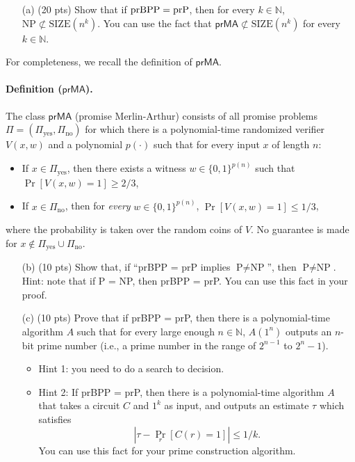 \documentclass[12pt]{article}
\newcommand{\SIZE}{\text{SIZE}}
\newcommand{\NP}{\text{NP}}
\begin{document}
\begin{enumerate}
    \item[(a)] (20 pts) Show that if $\text{prBPP} = \text{prP}$, then for every $k \in \mathbb{N}$, $\NP \not\subset \SIZE(n^k)$. You can use the fact that $\mathsf{prMA} \not\subset \SIZE(n^k)$ for every $k \in \mathbb{N}$.
\end{enumerate}

For completeness, we recall the definition of $\mathsf{prMA}$.

\paragraph{Definition ($\mathsf{prMA}$).}
The class $\mathsf{prMA}$ (promise Merlin-Arthur) consists of all promise problems $\Pi = (\Pi_\text{yes}, \Pi_\text{no})$ for which there is a polynomial-time randomized verifier $V(x, w)$ and a polynomial $p(\cdot)$ such that for every input $x$ of length $n$:
\begin{itemize}
    \item If $x \in \Pi_\text{yes}$, then there exists a witness $w \in \{0,1\}^{p(n)}$ such that $\Pr[V(x, w) = 1] \geq 2/3$,
    \item If $x \in \Pi_\text{no}$, then for \emph{every} $w \in \{0,1\}^{p(n)}$, $\Pr[V(x, w) = 1] \leq 1/3$,
\end{itemize}
where the probability is taken over the random coins of $V$. No guarantee is made for $x \notin \Pi_\text{yes} \cup \Pi_\text{no}$.

\begin{enumerate}
    \item[(b)] (10 pts) Show that, if ``prBPP = prP implies $\text{P} \neq \text{NP}$'', then $\text{P} \neq \text{NP}$. Hint: note that if P = NP, then prBPP = prP. You can use this fact in your proof.
\end{enumerate}


\begin{enumerate}
    \item[(c)] (10 pts) Prove that if prBPP = prP, then there is a polynomial-time algorithm $A$ such that for every large enough $n \in \mathbb{N}$, $A(1^n)$ outputs an $n$-bit prime number (i.e., a prime number in the range of $2^{n-1}$ to $2^n-1$). 
    
    \begin{itemize}
        \item Hint 1: you need to do a search to decision.
        \item Hint 2: If prBPP = prP, then there is a polynomial-time algorithm $A$ that takes a circuit $C$ and $1^{k}$ as input, and outputs an estimate $\tau$ which satisfies
        \[
        \left| \tau - \Pr_{r}[C(r) = 1] \right| \leq 1/k.
        \]
        You can use this fact for your prime construction algorithm.
    \end{itemize}
\end{enumerate}
\end{document}
